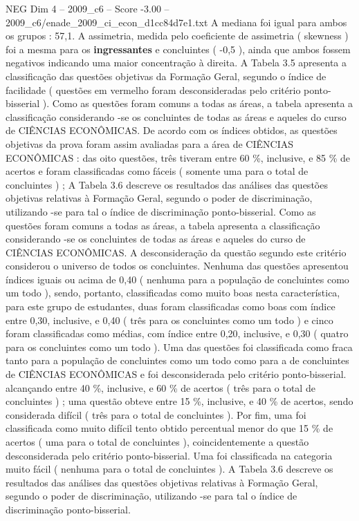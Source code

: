 \begin{textsample}{NEG Dim 4 – 2009\_c6 – Score -3.00 – 2009\_c6/enade\_2009\_ci\_econ\_d1cc84d7e1.txt}
A mediana foi igual para ambos os grupos : 57,1.
A assimetria, medida pelo coeficiente de assimetria ( skewness ) foi a mesma para os \textbf{ingressantes} e concluintes ( -0,5 ), ainda que ambos fossem negativos indicando uma maior concentração à direita.
A Tabela 3.5 apresenta a classificação das questões objetivas da Formação Geral, segundo o índice de facilidade ( questões em vermelho foram desconsideradas pelo critério ponto-bisserial ).
Como as questões foram comuns a todas as áreas, a tabela apresenta a classificação considerando -se os concluintes de todas as áreas e aqueles do curso de CIÊNCIAS ECONÔMICAS.
De acordo com os índices obtidos, as questões objetivas da prova foram assim avaliadas para a área de CIÊNCIAS ECONÔMICAS : das oito questões, três tiveram entre 60 \%, inclusive, e 85 \% de acertos e foram classificadas como fáceis ( somente uma para o total de concluintes ) ; A Tabela 3.6 descreve os resultados das análises das questões objetivas relativas à Formação Geral, segundo o poder de discriminação, utilizando -se para tal o índice de discriminação ponto-bisserial.
Como as questões foram comuns a todas as áreas, a tabela apresenta a classificação considerando -se os concluintes de todas as áreas e aqueles do curso de CIÊNCIAS ECONÔMICAS.
A desconsideração da questão segundo este critério considerou o universo de todos os concluintes.
Nenhuma das questões apresentou índices iguais ou acima de 0,40 ( nenhuma para a população de concluintes como um todo ), sendo, portanto, classificadas como muito boas nesta característica, para este grupo de estudantes, duas foram classificadas como boas com índice entre 0,30, inclusive, e 0,40 ( três para os concluintes como um todo ) e cinco foram classificadas como médias, com índice entre 0,20, inclusive, e 0,30 ( quatro para os concluintes como um todo ).
Uma das questões foi classificada como fraca tanto para a população de concluintes como um todo como para a de concluintes de CIÊNCIAS ECONÔMICAS e foi desconsiderada pelo critério ponto-bisserial. alcançando entre 40 \%, inclusive, e 60 \% de acertos ( três para o total de concluintes ) ; uma questão obteve entre 15 \%, inclusive, e 40 \% de acertos, sendo considerada difícil ( três para o total de concluintes ).
Por fim, uma foi classificada como muito difícil tento obtido percentual menor do que 15 \% de acertos ( uma para o total de concluintes ), coincidentemente a questão desconsiderada pelo critério ponto-bisserial.
Uma foi classificada na categoria muito fácil ( nenhuma para o total de concluintes ).
A Tabela 3.6 descreve os resultados das análises das questões objetivas relativas à Formação Geral, segundo o poder de discriminação, utilizando -se para tal o índice de discriminação ponto-bisserial.

\end{textsample}
